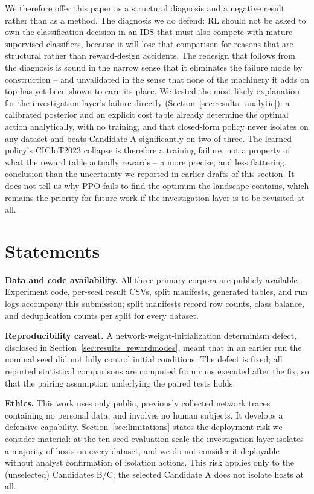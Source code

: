 \documentclass[journal]{IEEEtran}
\begin{document}
We therefore offer this paper as a structural diagnosis and a negative
result rather than as a method. The diagnosis we do defend: RL should not be
asked to own the classification decision in an IDS that must also compete
with mature supervised classifiers, because it will lose that comparison for
reasons that are structural rather than reward-design accidents. The
redesign that follows from the diagnosis is sound in the narrow sense that it
eliminates the failure mode by construction -- and unvalidated in the sense
that none of the machinery it adds on top has yet been shown to earn its
place. We tested the most likely explanation for the investigation layer's
failure directly (Section~\ref{sec:results_analytic}): a calibrated posterior
and an explicit cost table already determine the optimal action
analytically, with no training, and that closed-form policy never isolates
on any dataset and beats Candidate A significantly on two of three. The
learned policy's CICIoT2023 collapse is therefore a training failure, not a
property of what the reward table actually rewards -- a more precise, and
less flattering, conclusion than the uncertainty we reported in earlier
drafts of this section. It does not tell us why PPO fails to find the
optimum the landscape contains, which remains the priority for future work
if the investigation layer is to be revisited at all.

\section*{Statements}

\textbf{Data and code availability.} All three primary corpora are publicly
available~\cite{moustafa2015unswnb15,alsaedi2020toniot,neto2023ciciot2023}.
Experiment code, per-seed result CSVs, split manifests, generated tables, and
run logs accompany this submission; split manifests record row counts, class
balance, and deduplication counts per split for every dataset.

\textbf{Reproducibility caveat.} A network-weight-initialization determinism
defect, disclosed in Section~\ref{sec:results_rewardmodes}, meant that in an
earlier run the nominal seed did not fully control initial conditions. The
defect is fixed; all reported statistical comparisons are computed from runs
executed after the fix, so that the pairing assumption underlying the paired
tests holds.

\textbf{Ethics.} This work uses only public, previously collected network
traces containing no personal data, and involves no human subjects. It
develops a defensive capability. Section~\ref{sec:limitations} states the
deployment risk we consider material: at the ten-seed evaluation scale the
investigation layer isolates a majority of hosts on every dataset, and we do
not consider it deployable without analyst confirmation of isolation
actions. This risk applies only to the (unselected) Candidates B/C; the
selected Candidate A does not isolate hosts at all.
\end{document}
